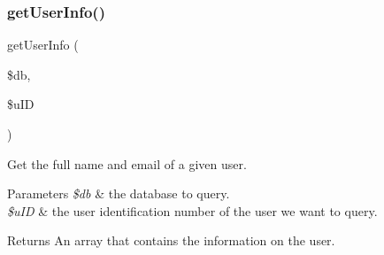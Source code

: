 \subsubsection{\texorpdfstring{get\+User\+Info()}{getUserInfo()}}
{\footnotesize\ttfamily get\+User\+Info (\begin{DoxyParamCaption}\item[{}]{\$db,  }\item[{}]{\$u\+ID }\end{DoxyParamCaption})}



Get the full name and email of a given user. 


\begin{DoxyParams}{Parameters}
{\em \$db} & the database to query. \\
\hline
{\em \$u\+ID} & the user identification number of the user we want to query. \\
\hline
\end{DoxyParams}
\begin{DoxyReturn}{Returns}
An array that contains the information on the user. 
\end{DoxyReturn}

